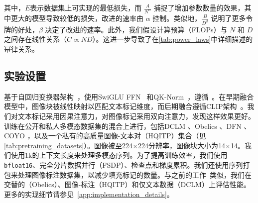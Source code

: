 \noindent 其中，\(E\)表示数据集上可实现的最低损失，而 \(\frac{A}{N^{\alpha}}\) 捕捉了增加参数数量的效果，其中更大的模型导致较低的损失，改进的速率由 \(\alpha\) 控制。类似地，\(\frac{B}{D^{\beta}}\) 说明了更多令牌的好处，\(\beta\) 决定了改进的速率。此外，我们假设计算预算（FLOPs）与 \(N\) 和 \(D\) 之间存在线性关系（\(C \propto ND\)）。这进一步导致了在\cref{tab:power_laws}中详细描述的幂律关系。



\begin{table}[h]
    \centering
    \setlength{\tabcolsep}{16pt}
    \renewcommand{\arraystretch}{1}
     \caption{\textbf{预训练数据混合。}除非另有说明，训练数据混合中包含 45\%、45\% 和 10\% 的图像标题、交错文档和纯文本数据。}
    \label{tab:pretraining_datasets}
    \vspace{-5pt}
\end{table}
\subsection{实验设置}
 基于自回归变换器架构~\citep{vaswani2017attention}，使用SwiGLU FFN~\citep{shazeer2020glu} 和QK-Norm~\citep{dehghani2023scaling}，遵循~\citet{li2024datacomp}。在早期融合模型中，图像块被线性映射以匹配文本标记维度，而后期融合遵循CLIP架构~\citep{radford2021learning}。我们对文本标记采用因果注意力，对图像标记采用双向注意力，发现这样效果更好。训练在公开和私人多模态数据集的混合上进行，包括DCLM \citep{li2024datacomp}、Obelics \citep{laurenccon2024obelics}、DFN \citep{fang2023data}、COYO \citep{kakaobrain2022coyo700m}，以及一个私有的高质量图像-文本对（HQITP）集合（见\cref{tab:pretraining_datasets}）。图像被至224×224分辨率，图像块大小为14×14。我们使用1k的上下文长度来处理多模态序列。为了提高训练效率，我们使用\texttt{bfloat16}、完全分片数据并行（FSDP）\citep{zhao2023pytorch}、检查点和梯度累积。我们还使用序列打包来处理图像标注数据集，以减少填充标记的数量。与之前的工作~\citep{hoffmann2022training,aghajanyan2023scalingmm,abnar2025parameters}类似，我们在交替的（Obelics）、图像-标注（HQITP）和仅文本数据（DCLM）上评估性能。更多的实现细节请参见~\cref{app:implementation_details}。
